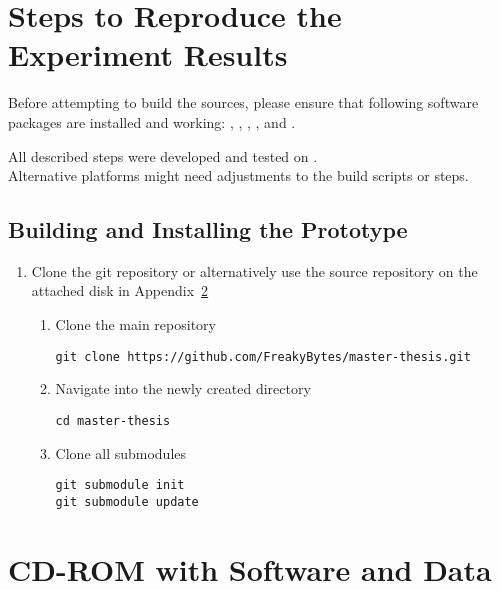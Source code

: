 \chapter{Steps to Reproduce the Experiment Results}
\label{app:reproduce}

Before attempting to build the sources, please ensure that following software packages are installed and working:
, , , , and .

All described steps were developed and tested on
.\\
Alternative platforms might need adjustments to the build scripts or steps.


\section{Building and Installing the Prototype}
\label{app:reproduce:build}

\begin{enumerate}
	\item Clone the git repository or alternatively use the source repository on the attached disk in Appendix~\ref{app:disk}
		\begin{enumerate}
			\item Clone the main repository
\begin{lstlisting}
git clone https://github.com/FreakyBytes/master-thesis.git
\end{lstlisting}
			\item Navigate into the newly created directory
\begin{lstlisting}
cd master-thesis
\end{lstlisting}			
			\item Clone all submodules
\begin{lstlisting}
git submodule init
git submodule update
\end{lstlisting}
		\end{enumerate}
\end{enumerate}

\chapter{CD-ROM with Software and Data}
\label{app:disk}